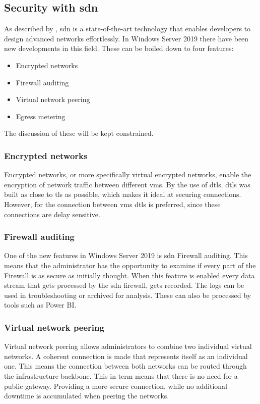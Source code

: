 \subsection{Security with \acrshort{sdn}}
\label{encrypted-networks}
\label{sdn}
As described by \textcite{Shin2016}, \acrshort{sdn} is a state-of-the-art technology that enables developers to design advanced networks effortlessly. In Windows Server 2019 there have been new developments in this field. These can be boiled down to four features: 
\begin{itemize}
	\item Encrypted networks
	\item Firewall auditing
	\item Virtual network peering
	\item Egress metering
\end{itemize} 
The discussion of these will be kept constrained.
\subsubsection{Encrypted networks}
Encrypted networks, or more specifically virtual encrypted networks, enable the encryption of network traffic between different \acrshort{vm}s. By the use of \acrfull{dtls}. \acrshort{dtls} was built as close to \acrfull{tls} as possible, which makes it ideal at securing connections. However, for the connection between \acrshort{vm}s \acrshort{dtls} is preferred, since these connections are delay sensitive.\autocite{Modadugu2004}

\subsubsection{Firewall auditing}
One of the new features in Windows Server 2019 is \acrshort{sdn} Firewall auditing. This means that the administrator has the opportunity to examine if every part of the Firewall is as secure as initially thought. When this feature is enabled every data stream that gets processed by the \acrshort{sdn} firewall, gets recorded. The logs can be used in troubleshooting or archived for analysis. These can also be processed by tools such as Power BI.

\subsubsection{Virtual network peering}
Virtual network peering allows administrators to combine two individual virtual networks. A coherent connection is made that represents itself as an individual one. This means the connection between both networks can be routed through the infrastructure backbone. This in term means that there is no need for a public gateway. Providing a more secure connection, while no additional downtime is accumulated when peering the networks.

